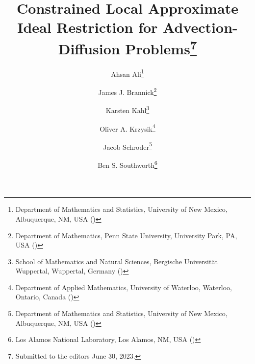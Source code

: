 

\ifpdf
\else
\fi

\newcommand{\creflastconjunction}{, and~}


\headers{}{}

\title{Constrained Local Approximate Ideal Restriction for Advection-Diffusion Problems\thanks{Submitted to the editors June 30, 2023.
 }}

\author{Ahsan Ali\thanks{Department of Mathematics and Statistics, University of New Mexico, Albuquerque, NM, USA ()}
\and James J. Brannick\thanks{Department of Mathematics, Penn State University, University Park, PA, USA ()}
\and Karsten Kahl\thanks{School of Mathematics and Natural Sciences, Bergische Universit\"{a}t Wuppertal, Wuppertal, Germany ()}
\and Oliver A. Krzysik\thanks{Department of Applied Mathematics, University of Waterloo, Waterloo, Ontario, Canada ()}
\and Jacob Schroder\thanks{Department of Mathematics and Statistics, University of New Mexico, Albuquerque, NM, USA ()}
\and Ben S. Southworth\thanks{Los Alamos National Laboratory, Los Alamos, NM, USA () }}

\usepackage{amsopn}
\DeclareMathOperator{\diag}{diag}


